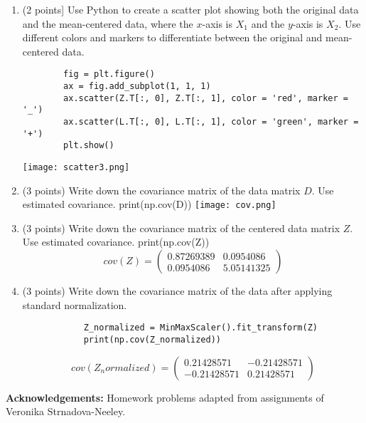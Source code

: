 \documentclass[11pt]{article}
\begin{document}
\begin{enumerate}
\begin{enumerate}
        \item (2 points] Use Python to create a scatter plot showing both the
        original data and the mean-centered data, where the $x$-axis is $X_1$
        and the $y$-axis is $X_2$. Use different colors and markers to
        differentiate between the original and mean-centered data.
        \newline \begin{lstlisting}
        fig = plt.figure()
        ax = fig.add_subplot(1, 1, 1)
        ax.scatter(Z.T[:, 0], Z.T[:, 1], color = 'red', marker = '_')
        ax.scatter(L.T[:, 0], L.T[:, 1], color = 'green', marker = '+')
        plt.show()
        \end{lstlisting}
        \newline \texttt{[image: scatter3.png]}
        \newpage
        \item (3 points) Write down the covariance matrix of the data matrix
        $D$. Use estimated covariance.
        \newline print(np.cov(D))
        \newline \texttt{[image: cov.png]}
        
        \item (3 points) Write down the covariance matrix of the centered data
        matrix $Z$. Use estimated covariance.
        \newline print(np.cov(Z))
        $$ cov(Z) = \begin{pmatrix}
            0.87269389 & 0.0954086 \\
            0.0954086 & 5.05141325
        \end{pmatrix}$$

        \item (3 points) Write down the covariance matrix of the data after
        applying standard normalization.
        \newline \begin{lstlisting}
            Z_normalized = MinMaxScaler().fit_transform(Z)
            print(np.cov(Z_normalized))
            \end{lstlisting}
        \newline $$cov(Z_normalized) = \begin{pmatrix}
        0.21428571 & -0.21428571 \\
        -0.21428571 & 0.21428571
        \end{pmatrix}$$
    \end{enumerate}

\end{enumerate}

{\bf Acknowledgements:} Homework problems adapted from assignments of
Veronika Strnadova-Neeley.
\end{document}

